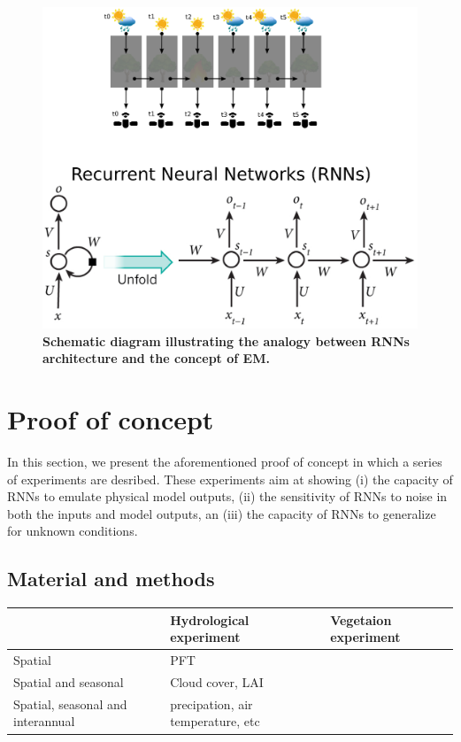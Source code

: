 \begin{figure}[!ht]
    \centering
    \includegraphics[scale=.6]{figs/Fig2.eps}
    \caption{\textbf{Schematic diagram illustrating the analogy between RNNs architecture and the concept of EM.}}
    \label{fig:14.2}
\end{figure}

\section{Proof of concept}

    In this section, we present the aforementioned proof of concept in which a series of experiments are desribed. These experiments aim at showing (i) the capacity of RNNs to emulate physical model outputs, (ii) the sensitivity of RNNs to noise in both the inputs and model outputs, an (iii) the capacity of RNNs to generalize for unknown conditions.    

\subsection{Material and methods}

    \begin{table}[!ht]
    \begin{tabular}{l|l|l}
    & Hydrological experiment & Vegetaion experiment \\ \hline
    Spatial & PFT &  \\
    Spatial and seasonal & Cloud cover, LAI &  \\
    Spatial, seasonal and interannual & precipation, air temperature, etc & 
    \end{tabular}
    \end{table}

